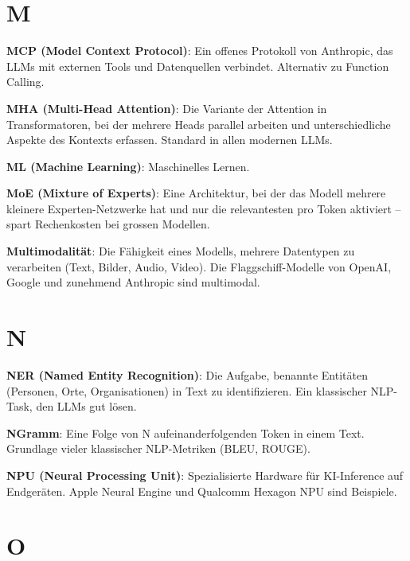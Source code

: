 \section{M}

\textbf{MCP (Model Context Protocol)}\hspace{0pt}: Ein offenes Protokoll von Anthropic, das LLMs mit externen Tools und Datenquellen verbindet. Alternativ zu Function Calling.

\textbf{MHA (Multi-Head Attention)}\hspace{0pt}: Die Variante der Attention in Transformatoren, bei der mehrere Heads parallel arbeiten und unterschiedliche Aspekte des Kontexts erfassen. Standard in allen modernen LLMs.

\textbf{ML (Machine Learning)}\hspace{0pt}: Maschinelles Lernen.

\textbf{MoE (Mixture of Experts)}\hspace{0pt}: Eine Architektur, bei der das Modell mehrere kleinere Experten-Netzwerke hat und nur die relevantesten pro Token aktiviert -- spart Rechenkosten bei grossen Modellen.

\textbf{Multimodalität}\hspace{0pt}: Die Fähigkeit eines Modells, mehrere Datentypen zu verarbeiten (Text, Bilder, Audio, Video). Die Flaggschiff-Modelle von OpenAI, Google und zunehmend Anthropic sind multimodal.

\section{N}

\textbf{NER (Named Entity Recognition)}\hspace{0pt}: Die Aufgabe, benannte Entitäten (Personen, Orte, Organisationen) in Text zu identifizieren. Ein klassischer NLP-Task, den LLMs gut lösen.

\textbf{NGramm}\hspace{0pt}: Eine Folge von N aufeinanderfolgenden Token in einem Text. Grundlage vieler klassischer NLP-Metriken (BLEU, ROUGE).

\textbf{NPU (Neural Processing Unit)}\hspace{0pt}: Spezialisierte Hardware für KI-Inference auf Endgeräten. Apple Neural Engine und Qualcomm Hexagon NPU sind Beispiele.

\section{O}

